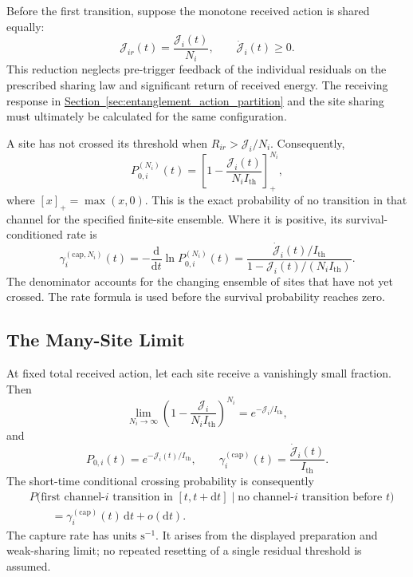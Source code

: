 Before the first transition, suppose the monotone received action is shared equally:
\begin{equation}
    \mathcal J_{ir}(t)=\frac{\mathcal J_i(t)}{N_i},
    \qquad \dot{\mathcal J}_i(t)\geq0.
\end{equation}
This reduction neglects pre-trigger feedback of the individual residuals on the prescribed sharing law and significant return of received energy. The receiving response in \hyperref[sec:entanglement_action_partition]{Section~\ref*{sec:entanglement_action_partition}} and the site sharing must ultimately be calculated for the same configuration.

A site has not crossed its threshold when $R_{ir}>\mathcal J_i/N_i$. Consequently,
\begin{equation}
    \boxed{
    P_{0,i}^{(N_i)}(t)
    =\left[
        1-\frac{\mathcal J_i(t)}{N_i I_{\mathrm{th}}}
      \right]_+^{N_i}
    },
\end{equation}
where $[x]_+=\max(x,0)$. This is the exact probability of no transition in that channel for the specified finite-site ensemble. Where it is positive, its survival-conditioned rate is
\begin{equation}
    \boxed{
    \gamma_i^{(\mathrm{cap},N_i)}(t)
    =-\frac{\mathrm d}{\mathrm dt}\ln P_{0,i}^{(N_i)}(t)
    =\frac{\dot{\mathcal J}_i(t)/I_{\mathrm{th}}}
     {1-\mathcal J_i(t)/(N_i I_{\mathrm{th}})}
    }.
\end{equation}
The denominator accounts for the changing ensemble of sites that have not yet crossed. The rate formula is used before the survival probability reaches zero.

\subsection{The Many-Site Limit}

At fixed total received action, let each site receive a vanishingly small fraction. Then
\begin{equation}
    \lim_{N_i\rightarrow\infty}
    \left(1-\frac{\mathcal J_i}{N_i I_{\mathrm{th}}}\right)^{N_i}
    =e^{-\mathcal J_i/I_{\mathrm{th}}},
\end{equation}
and
\begin{equation}
    \boxed{
    P_{0,i}(t)=e^{-\mathcal J_i(t)/I_{\mathrm{th}}},
    \qquad
    \gamma_i^{(\mathrm{cap})}(t)
    =\frac{\dot{\mathcal J}_i(t)}{I_{\mathrm{th}}}
    }.
    \label{eq:entanglement_capture_rate}
\end{equation}
The short-time conditional crossing probability is consequently
\begin{equation}
    \begin{aligned}
    &P\bigl(\text{first channel-$i$ transition in }[t,t+\mathrm dt]
         \mid\text{no channel-$i$ transition before }t\bigr)\\
    &\qquad=\gamma_i^{(\mathrm{cap})}(t)\,\mathrm dt+o(\mathrm dt).
    \end{aligned}
    \label{eq:entanglement_threshold_crossing}
\end{equation}
The capture rate has units $\mathrm{s^{-1}}$. It arises from the displayed preparation and weak-sharing limit; no repeated resetting of a single residual threshold is assumed.

